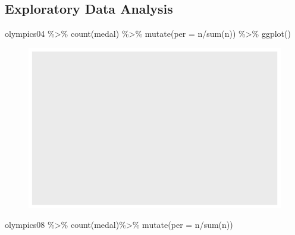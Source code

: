 \documentclass[
  letterpaper,
  DIV=11,
  numbers=noendperiod]{scrartcl}
\newenvironment{Shaded}{\begin{snugshade}}{\end{snugshade}}
\newcommand{\AttributeTok}[1]{\textcolor[rgb]{0.40,0.45,0.13}{#1}}
\newcommand{\FunctionTok}[1]{\textcolor[rgb]{0.28,0.35,0.67}{#1}}
\newcommand{\NormalTok}[1]{\textcolor[rgb]{0.00,0.23,0.31}{#1}}
\newcommand{\SpecialCharTok}[1]{\textcolor[rgb]{0.37,0.37,0.37}{#1}}
\begin{document}
\hfill\break

\hypertarget{exploratory-data-analysis}{%
\subsection{Exploratory Data Analysis}\label{exploratory-data-analysis}}

\begin{Shaded}
\begin{Highlighting}[]
\NormalTok{olympics04 }\SpecialCharTok{\%\textgreater{}\%}
  \FunctionTok{count}\NormalTok{(medal) }\SpecialCharTok{\%\textgreater{}\%}
  \FunctionTok{mutate}\NormalTok{(}\AttributeTok{per =}\NormalTok{ n}\SpecialCharTok{/}\FunctionTok{sum}\NormalTok{(n)) }\SpecialCharTok{\%\textgreater{}\%}
  \FunctionTok{ggplot}\NormalTok{()}
\end{Highlighting}
\end{Shaded}

\begin{figure}[H]

{\centering \includegraphics{project_files/figure-pdf/unnamed-chunk-2-1.pdf}

}

\end{figure}

\begin{Shaded}
\begin{Highlighting}[]
\NormalTok{olympics08 }\SpecialCharTok{\%\textgreater{}\%}
  \FunctionTok{count}\NormalTok{(medal)}\SpecialCharTok{\%\textgreater{}\%}
  \FunctionTok{mutate}\NormalTok{(}\AttributeTok{per =}\NormalTok{ n}\SpecialCharTok{/}\FunctionTok{sum}\NormalTok{(n))}
\end{Highlighting}
\end{Shaded}
\end{document}
